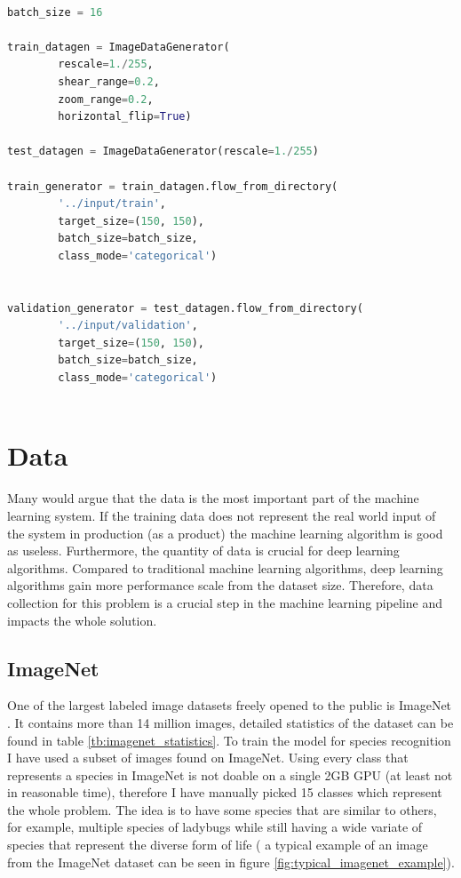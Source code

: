 \documentclass[times, utf8, diplomski]{fer}
\begin{document}
\begin{lstlisting}[language=Python, caption=Data augmentation of the input dataset (images)]

batch_size = 16

train_datagen = ImageDataGenerator(
        rescale=1./255,
        shear_range=0.2,
        zoom_range=0.2,
        horizontal_flip=True)

test_datagen = ImageDataGenerator(rescale=1./255)

train_generator = train_datagen.flow_from_directory(
        '../input/train',
        target_size=(150, 150),
        batch_size=batch_size,
        class_mode='categorical') 


validation_generator = test_datagen.flow_from_directory(
        '../input/validation',
        target_size=(150, 150),
        batch_size=batch_size,
        class_mode='categorical')
        
\end{lstlisting}

\chapter{Data}

Many would argue that the data is the most important part of the machine learning system. If the training data does not represent the real world input of the system in production (as a product) the machine learning algorithm is good as useless. Furthermore, the quantity of data is crucial for deep learning algorithms. Compared to traditional machine learning algorithms, deep learning algorithms gain more performance scale from the dataset size. Therefore, data collection for this problem is a crucial step in the machine learning pipeline and impacts the whole solution.

\section{ImageNet}
\label{se:imagenet}

One of the largest labeled image datasets freely opened to the public is ImageNet \citep{imagenet}. It contains more than 14 million images, detailed statistics of the dataset can be found in table \ref{tb:imagenet_statistics}. To train the model for species recognition I have used a subset of images found on ImageNet. Using every class that represents a species in ImageNet is not doable on a single 2GB GPU (at least not in reasonable time), therefore I have manually picked 15 classes which represent the whole problem. The idea is to have some species that are similar to others, for example, multiple species of ladybugs while still having a wide variate of species that represent the diverse form of life ( a typical example of an image from the ImageNet dataset can be seen in figure \ref{fig:typical_imagenet_example}).
\end{document}
